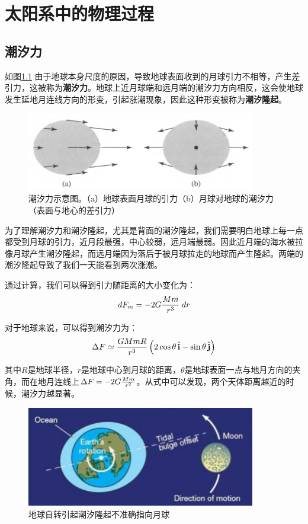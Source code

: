 \chapter{太阳系中的物理过程}
\section{潮汐力}
如图\ref{fig:tidalforce} 由于地球本身尺度的原因，导致地球表面收到的月球引力不相等，产生差引力，这被称为\textbf{潮汐力}。地球上近月球端和远月端的潮汐力方向相反，这会使地球发生延地月连线方向的形变，引起涨潮现象，因此这种形变被称为\textbf{潮汐隆起}。

\begin{figure}[hbt]
  \centering
  \includegraphics[width=10cm]{chapters/19/tidalforce}
  \caption{潮汐力示意图。（a）地球表面月球的引力（b）月球对地球的潮汐力（表面与地心的差引力）}
  \label{fig:tidalforce}
\end{figure}

为了理解潮汐力和潮汐隆起，尤其是背面的潮汐隆起，我们需要明白地球上每一点都受到月球的引力，近月段最强，中心较弱，远月端最弱。因此近月端的海水被拉像月球产生潮汐隆起，而远月端因为落后于被月球拉走的地球而产生隆起。两端的潮汐隆起导致了我们一天能看到两次涨潮。

通过计算，我们可以得到引力随距离的大小变化为：
\begin{equation}
  dF_m=-2G{Mm\over r^3}\;dr
\end{equation}

对于地球来说，可以得到潮汐力为：
\begin{equation}
  \Delta F\simeq{GMmR\over r^3}\left(2\cos\theta\,\hat{\mathbf i}-\sin\theta\,\hat{\mathbf j}\right)
\end{equation}

其中$R$是地球半径，$r$是地球中心到月球的距离，$\theta$是地球表面一点与地月方向的夹角，而在地月连线上$\Delta F=-2G{Mm\over r^2}$。从式中可以发现，两个天体距离越近的时候，潮汐力越显著。

\begin{figure}[hbt]
  \centering
  \includegraphics[width=10cm]{chapters/19/tidalbulge}
  \caption{地球自转引起潮汐隆起不准确指向月球}
  \label{fig:tidalbulge}
\end{figure}

